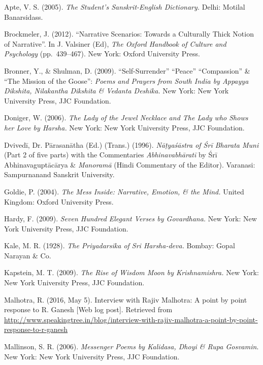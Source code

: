 \begin{thebibliography}{99}
\itemsep=2pt
Apte, V. S. (2005). \textsl{The Student’s Sanskrit-English Dictionary.} Delhi: Motilal Banarsidass.

Brockmeler, J. (2012). “Narrative Scenarios: Towards a Culturally Thick Notion of Narrative”. In J. Valsiner (Ed), \textsl{The Oxford Handbook of Culture and Psychology} (pp.~439--467). New York: Oxford University Press.

Bronner, Y., \& Shulman, D. (2009). “Self-Surrender” “Peace” “Compassion” \& “The Mission of the Goose”: \textsl{Poems and Prayers from South India by Appayya Dikshita, Nilakantha Dikshita \& Vedanta Deshika.} New York: New York University Press, JJC Foundation.

Doniger, W. (2006). \textsl{The Lady of the Jewel Necklace and The Lady who Shows her Love by Harsha.} New York: New York University Press, JJC Foundation.

Dvivedī, Dr. Pārasanātha (Ed.) (Trans.) (1996). \textsl{Nāṭyaśāstra of Śrī Bharata Muni} (Part 2 of five parts) with the Commentaries  \textsl{Abhinavabhāratī} by Śrī Abhinavaguptācārya \& \textsl{Manoramā} (Hindi Commentary of the Editor). Varanasi: Sampurnanand Sanskrit University.

Goldie, P. (2004). \textsl{The Mess Inside: Narrative, Emotion, \& the Mind.} United Kingdom: Oxford University Press.

Hardy, F. (2009). \textsl{Seven Hundred Elegant Verses by Govardhana.} New York: New York University Press, JJC Foundation.

Kale, M. R. (1928). \textsl{The Priyadarsika of Sri Harsha-deva.} Bombay: Gopal Narayan \& Co.

Kapstein, M. T. (2009). \textsl{The Rise of Wisdom Moon by Krishnamishra.} New York: New York University Press, JJC Foundation.

Malhotra, R. (2016, May 5). Interview with Rajiv Malhotra: A point by point response to R. Ganesh [Web log post]. Retrieved from   \url{http://www.speakingtree.in/blog/interview-with-rajiv-malhotra-a-point-by-point-response-to-r-ganesh}

Mallinson, S. R. (2006). \textsl{Messenger Poems by Kalidasa, Dhoyi \& Rupa Gosvamin}. New York: New York University Press, JJC Foundation.


\end{thebibliography}
